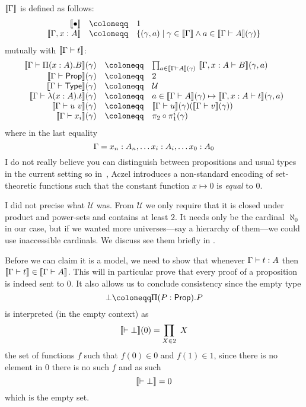 \(\llbracket \Gamma \rrbracket\) is defined as follows:
\[
  \begin{array}{rcl}
    \transl{\ctxempty} &\coloneqq& 1 \\
    \transl{\Ga, x:A} &\coloneqq&
    \{
      (\gamma, a) \mid
      \gamma \in \transl{\Ga} \wedge a \in \transl{\Ga \vdash A}(\gamma)
    \}
  \end{array}
\]
mutually with \(\llbracket \Gamma \vdash t \rrbracket\):
\[
  \begin{array}{rcl}
    \transl{\Ga \vdash \Pi (x:A). B}(\gamma)
    &\coloneqq&
    \prod_{a \in \transl{\Ga \vdash A}(\gamma)}\
    \transl{\Ga, x:A \vdash B}(\gamma, a) \\
    \transl{\Ga \vdash \Prop}(\gamma) &\coloneqq& 2 \\
    \transl{\Ga \vdash \Type}(\gamma) &\coloneqq& \mathcal{U} \\
    \transl{\Ga \vdash \lambda (x:A). t}(\gamma)
    &\coloneqq&
    a \in \transl{\Ga \vdash A}(\gamma) \mapsto
    \transl{\Ga, x:A \vdash t}(\gamma,a) \\
    \transl{\Ga \vdash u\ v}(\gamma) &\coloneqq&
    \transl{\Ga \vdash u}(\gamma)(\transl{\Ga \vdash v}(\gamma)) \\
    \transl{\Ga \vdash x_i}(\gamma) &\coloneqq& \pi_2 \circ \pi_1^i (\gamma)
  \end{array}
\]
where in the last equality
\[
  \Gamma = x_n : A_n, \dots x_i : A_i, \dots x_0 : A_0
\]
I do not really believe you can distinguish between propositions and usual types
in the current setting so in~\sidecite{aczel1998relating}, Aczel introduces a
non-standard encoding of set-theoretic functions such that the constant function
\(x \mapsto 0\) is \emph{equal} to \(0\).

I did not precise what \(\mathcal{U}\) was. From \(\mathcal{U}\) we only require
that it is closed under product and power-sets and contains at least \(2\).
It needs only be the cardinal \(\aleph_0\) in our case, but if we wanted more
universes---say a hierarchy of them---we could use inaccessible cardinals.
We discuss see them briefly in \refsec{cat-models}.


Before we can claim it is a model, we need to show that whenever
\(\Gamma \vdash t : A\) then \(\llbracket \Gamma \vdash t \rrbracket \in \llbracket \Gamma \vdash A \rrbracket\).
This will in particular prove that every proof of a proposition is indeed sent
to \(0\).
It also allows us to conclude consistency since the empty type
\[
  \bot \coloneqq \Pi (P : \Prop). P
\]
is interpreted (in the empty context) as
\[
  \transl{\vdash \bot}(0) = \prod_{X \in 2}\ X
\]
\ie the set of functions \(f\) such that \(f(0) \in 0\) and \(f(1) \in 1\),
since there is no element in \(0\) there is no such \(f\) and as such
\[
  \llbracket \vdash \bot \rrbracket = 0
\]
which is the empty set.

